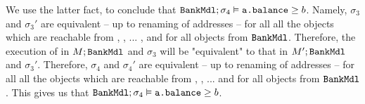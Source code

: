 We use the latter fact, to conclude that ${\texttt{BankMdl}};\sigma_4 \vDash {\texttt{a.balance}} \geq b$.
Namely, $\sigma_3$ and $\sigma_3'$ are equivalent -- up to renaming of addresses  -- for all all the objects which are
reachable from , , ... , and for all objects from 
${\texttt{BankMdl}}$. Therefore, the execution of  in $M;{\texttt{BankMdl}}$ and $\sigma_3$
will be "equivalent" to that in $M';{\texttt{BankMdl}}$ and $\sigma_3'$. Therefore, $\sigma_4$ and $\sigma_4'$ are equivalent -- up to renaming of addresses  -- for all all the objects which are
reachable from , , ...  and for all objects from 
${\texttt{BankMdl}}$.
This gives us that  ${\texttt{BankMdl}};\sigma_4 \vDash {\texttt{a.balance}} \geq b$.

%
%
% 
 



